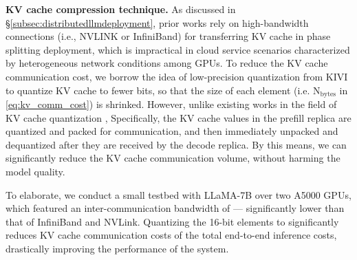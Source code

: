 \textbf{KV cache compression technique.} As discussed in \S\ref{subsec:distributedllmdeployment}, prior works rely on high-bandwidth connections (i.e., NVLINK or InfiniBand) for transferring KV cache in phase splitting deployment, which is impractical in cloud service scenarios characterized by heterogeneous network conditions among GPUs. 
To reduce the KV cache communication cost, we borrow the idea of low-precision quantization from KIVI \cite{kivi2024} to quantize KV cache to fewer bits, so that the size of each element (i.e. \(\text{N}_{\text{bytes}} \) in \autoref{eq:kv_comm_cost}) is shrinked.
However, unlike existing works in the field of KV cache quantization \cite{kivi2024,kang2024gear}, 
Specifically, the KV cache values in the prefill replica are quantized and packed for communication, and then immediately unpacked and dequantized after they are received by the decode replica. 
By this means, we can significantly reduce the KV cache communication volume, without harming the model quality.

To elaborate, we conduct a small testbed with LLaMA-7B over two A5000 GPUs, which featured an inter-communication bandwidth of  --- significantly lower than that of InfiniBand and NVLink. 
Quantizing the 16-bit elements to  significantly reduces KV cache communication costs  of the total end-to-end inference costs, drastically improving the performance of the system. 


